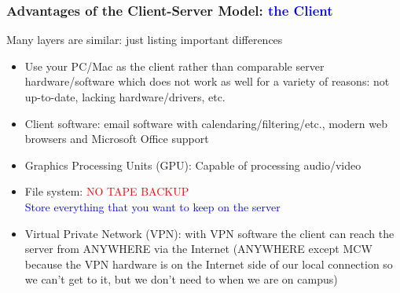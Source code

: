 \documentclass[11pt,pdftex,dvipsnames,usenames,helvetica]{beamer}
\begin{document}
\begin{frame}
\frametitle{Advantages of the Client-Server Model: \textcolor{blue}{the Client}}
Many layers are similar: just listing important differences
\begin{itemize}
\item Use your PC/Mac as the client rather than 
                comparable server hardware/software which does not
		work as well for a variety of reasons: not up-to-date,
                lacking hardware/drivers, %
		etc.
\item Client software: email software with calendaring/filtering/etc., 
modern web browsers and Microsoft Office support
\item Graphics Processing Units (GPU):
          Capable of processing audio/video
\item File system: \textcolor{red}{NO TAPE BACKUP} \\ 
\textcolor{blue}{Store everything that you want
to keep on the server}
\item Virtual Private Network (VPN): with VPN software
the client can reach the server from ANYWHERE via the Internet
(ANYWHERE except MCW because the VPN hardware is on the
Internet side of our local connection so we can't get to it,
but we don't need to when we are on campus)
\end{itemize}

\end{frame}

\begin{comment}
\begin{frame}
\frametitle{Distant third phenomenon}

Slight preference for first over second and a wide distance to third
Example 1, hierarchy of biomedical evidence
\begin{enumerate}
\item[1] randomized clinical trials
\item[2] meta-analyses and reviews
\item[3] observational studies
\end{enumerate}

Example 2a, preference for article/dissertation citations
\begin{enumerate}
\item[1] journal articles 
\item[2] books in print
\item[3] technical reports, manuals, URLs, etc.
\end{enumerate}

Example 2b, reference material for computer science and technology
\begin{enumerate}
\item[1] books in print and online manuals/compendiums
\item[2] journal articles including prestigious proceedings
\item[3] Wikipedia
\end{enumerate}

\end{frame}
\end{comment}
\end{document}
